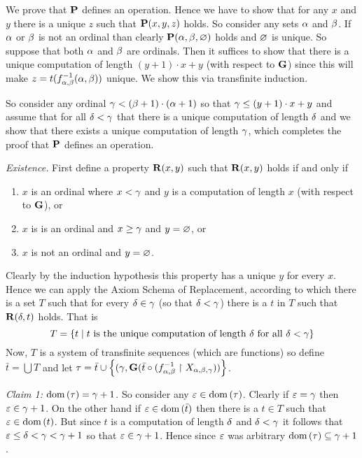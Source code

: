 {{    We prove that $\P$ defines an operation.
    Hence we have to show that  for any $x$ and $y$ there is a unique $z$ such that $\P(x,y,z)$ holds.
    So consider any sets $\a$ and $\b$.
    If $\a$ or $\b$ is not an ordinal than clearly $\P(\a,\b,\es)$ holds and $\es$ is unique.
    So suppose that both $\a$ and $\b$ are ordinals.
    Then it suffices to show that there is a unique computation of length $(y+1)\cdot x + y$ (with respect to $\G$) since this will make $z = t(\inv{f_{\a,\b}}(\a,\b))$ unique.
    We show this via transfinite induction.

    So consider any ordinal $\g < (\b+1) \cdot (\a+1)$ so that $\g \leq (y+1)\cdot x + y$ and assume that for all $\d < \g$ that there is a unique computation of length $\d$ and we show that there exists a unique computation of length $\g$, which completes the proof that $\P$ defines an operation.

    \emph{Existence.} First define a property $\R(x,y)$ such that $\R(x,y)$ holds if and only if
    \begin{enumerate}
      \item $x$ is an ordinal where $x < \g$ and $y$ is a computation of length $x$ (with respect to $\G$), or
      \item $x$ is is an ordinal and $x \geq \g$ and $y = \es$, or
      \item $x$ is not an ordinal and $y = \es$.
    \end{enumerate}
    Clearly by the induction hypothesis this property has a unique $y$ for every $x$.
    Hence we can apply the Axiom Schema of Replacement, according to which there is a set $T$ such that for every $\d \in \g$ (so that $\d < \g$) there is a $t$ in $T$ such that $\R(\d, t)$ holds.
    That is
    $$
      T = \braces{t \where t \text{ is the unique computation of length $\d$ for all $\d < \g$}}
    $$
    Now, $T$ is a system of transfinite sequences (which are functions) so define $\bar{t} = \bigcup T$ and let $\t = \bar{t} \cup \braces{(\g, \G(\bar{t} \circ (\inv{f_{\a,\b}} \rest X_{\a,\b,\g}))}$.

    \emph{Claim 1:} $\dom(\t) = \g+1$.
    So consider any $\e \in \dom(\t)$.
    Clearly if $\e = \g$ then $\e \in \g+1$.
    On the other hand if $\e \in \dom(\bar{t})$ then there is a $t \in T$ such that $\e \in \dom(t)$.
    But since $t$ is a computation of length $\d$ and $\d < \g$ it follows that $\e \leq \d < \g < \g+1$ so that $\e \in \g+1$.
    Hence since $\e$ was arbitrary $\dom(\t) \ss \g+1$.

}}

